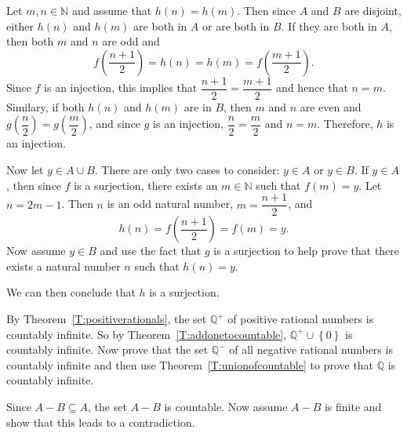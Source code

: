 \begin{list}{\bf{\ref{exer:unionofcountable}.}}
\item Let $m, n \in \mathbb{N}$ and assume that $h \left( n \right) = h \left( m \right)$. Then since $A$ and $B$ are disjoint, either $h \left( n \right)$ and $h \left( m \right)$ are both in $A$ or are both in $B$.  If they are both in $A$, then both $m$ and $n$ are odd and
\[
f \left( \frac{n + 1}{2} \right) = h \left( n \right) = h \left( m \right) = f \left( \frac{m + 1}{2} \right).
\]
Since $f$ is an injection, this implies that $\dfrac{n + 1}{2} = \dfrac{m + 1}{2}$ and hence that $n = m$.  Similary, if both $h \left( n \right)$ and $h \left( m \right)$ are in $B$, then $m$ and $n$ are even and $g \left( \dfrac{n}{2} \right) = g \left( \dfrac{m}{2} \right)$, and since $g$ is an injection, $\dfrac{n}{2} = \dfrac{m}{2}$ and $n = m$.  Therefore, $h$ is an injection.

Now let $y \in A \cup B$.  There are only two cases to consider:  $y \in A$ or $y \in B$.  If 
$y \in A$, then since $f$ is a surjection, there exists an $m \in \mathbb{N}$ such that 
$f \left( m \right) = y$.  Let $n = 2m - 1$.  Then $n$ is an odd natural number, 
$m = \dfrac{n + 1}{2}$,  and
\[
h \left( n \right) = f \left( \frac{n + 1}{2} \right) = f \left( m \right) = y.
\]
Now assume $y \in B$ and use the fact that $g$ is a surjection to help prove that there exists a natural number $n$ such that $h(n) = y$.

We can then conclude that $h$ is a surjection.
%
\end{list}


\begin{list}{\bf{\ref{exer:Qiscountable}.}}
\item By Theorem~\ref{T:positiverationals}, the set $\mathbb{Q}^+$ of positive rational numbers is countably infinite. So by Theorem~\ref{T:addonetocountable}, 
$\mathbb{Q}^+ \cup \left\{ 0 \right\}$ is countably infinite.  Now prove that the set $\mathbb{Q}^-$ of all negative rational numbers is countably infinite and then use  Theorem~\ref{T:unionofcountable} to prove that $\mathbb{Q}$ is countably infinite.

\end{list}

\begin{list}{\bf{\ref{exer:countinf-finite}.}}
\item Since $A - B \subseteq A$, the set $A - B$ is countable.  Now assume $A - B$ is finite and show that this leads to a contradiction.
\end{list}
\hbreak

\endinput



